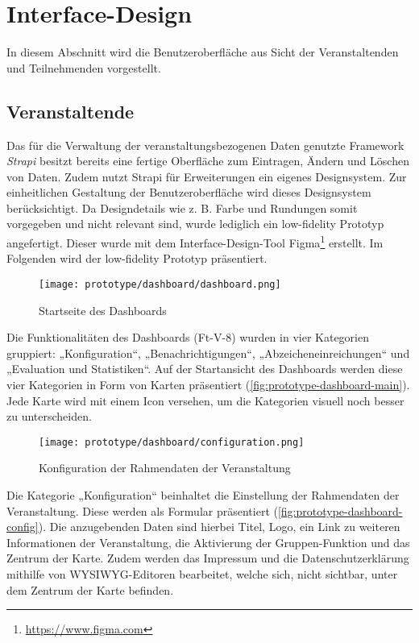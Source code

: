 \section{Interface-Design} \label{sec:interface-design}

In diesem Abschnitt wird die Benutzeroberfläche aus Sicht der Veranstaltenden
und Teilnehmenden vorgestellt.

\subsection{Veranstaltende} \label{ssec:interface-v}

Das für die Verwaltung der veranstaltungsbezogenen Daten genutzte Framework
\textit{Strapi} besitzt bereits eine fertige Oberfläche zum Eintragen, Ändern
und Löschen von Daten. Zudem nutzt Strapi für Erweiterungen ein eigenes
Designsystem. Zur einheitlichen Gestaltung der Benutzeroberfläche wird dieses
Designsystem berücksichtigt. Da Designdetails wie z. B. Farbe und Rundungen
somit vorgegeben und nicht relevant sind, wurde lediglich ein low-fidelity
Prototyp angefertigt. Dieser wurde mit dem Interface-Design-Tool
Figma\footnote{\url{https://www.figma.com}} erstellt. Im Folgenden wird der
low-fidelity Prototyp präsentiert.

\begin{figure}[htpb]
    \centering
    \texttt{[image: prototype/dashboard/dashboard.png]}
    \caption{Startseite des Dashboards}
    \label{fig:prototype-dashboard-main}
\end{figure}

Die Funktionalitäten des Dashboards (Ft-V-8) wurden in vier Kategorien
gruppiert: „Konfiguration“, „Benachrichtigungen“, „Abzeicheneinreichungen“ und
„Evaluation und Statistiken“. Auf der Startansicht des Dashboards werden diese
vier Kategorien in Form von Karten präsentiert
(\autoref{fig:prototype-dashboard-main}). Jede Karte wird mit einem Icon
versehen, um die Kategorien visuell noch besser zu unterscheiden.

\begin{figure}[htpb]
    \centering
    \texttt{[image: prototype/dashboard/configuration.png]}
    \caption{Konfiguration der Rahmendaten der Veranstaltung}
    \label{fig:prototype-dashboard-config}
\end{figure}

Die Kategorie „Konfiguration“ beinhaltet die Einstellung der Rahmendaten der
Veranstaltung. Diese werden als Formular präsentiert
(\autoref{fig:prototype-dashboard-config}). Die anzugebenden Daten sind hierbei
Titel, Logo, ein Link zu weiteren Informationen der Veranstaltung, die
Aktivierung der Gruppen-Funktion und das Zentrum der Karte. Zudem werden das
Impressum und die Datenschutzerklärung mithilfe von WYSIWYG-Editoren bearbeitet,
welche sich, nicht sichtbar, unter dem Zentrum der Karte befinden.

